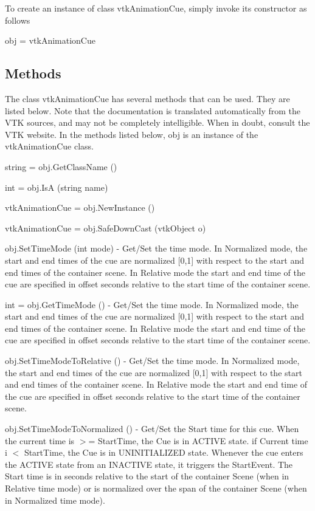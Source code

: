 To create an instance of class vtk\-Animation\-Cue, simply invoke its constructor as follows \begin{DoxyVerb}  obj = vtkAnimationCue
\end{DoxyVerb}
 \hypertarget{vtkwidgets_vtkxyplotwidget_Methods}{}\subsection{Methods}\label{vtkwidgets_vtkxyplotwidget_Methods}
The class vtk\-Animation\-Cue has several methods that can be used. They are listed below. Note that the documentation is translated automatically from the V\-T\-K sources, and may not be completely intelligible. When in doubt, consult the V\-T\-K website. In the methods listed below, {\ttfamily obj} is an instance of the vtk\-Animation\-Cue class. 
\begin{DoxyItemize}
\item {\ttfamily string = obj.\-Get\-Class\-Name ()}  
\item {\ttfamily int = obj.\-Is\-A (string name)}  
\item {\ttfamily vtk\-Animation\-Cue = obj.\-New\-Instance ()}  
\item {\ttfamily vtk\-Animation\-Cue = obj.\-Safe\-Down\-Cast (vtk\-Object o)}  
\item {\ttfamily obj.\-Set\-Time\-Mode (int mode)} -\/ Get/\-Set the time mode. In Normalized mode, the start and end times of the cue are normalized \mbox{[}0,1\mbox{]} with respect to the start and end times of the container scene. In Relative mode the start and end time of the cue are specified in offset seconds relative to the start time of the container scene.  
\item {\ttfamily int = obj.\-Get\-Time\-Mode ()} -\/ Get/\-Set the time mode. In Normalized mode, the start and end times of the cue are normalized \mbox{[}0,1\mbox{]} with respect to the start and end times of the container scene. In Relative mode the start and end time of the cue are specified in offset seconds relative to the start time of the container scene.  
\item {\ttfamily obj.\-Set\-Time\-Mode\-To\-Relative ()} -\/ Get/\-Set the time mode. In Normalized mode, the start and end times of the cue are normalized \mbox{[}0,1\mbox{]} with respect to the start and end times of the container scene. In Relative mode the start and end time of the cue are specified in offset seconds relative to the start time of the container scene.  
\item {\ttfamily obj.\-Set\-Time\-Mode\-To\-Normalized ()} -\/ Get/\-Set the Start time for this cue. When the current time is $>$= Start\-Time, the Cue is in A\-C\-T\-I\-V\-E state. if Current time i $<$ Start\-Time, the Cue is in U\-N\-I\-N\-I\-T\-I\-A\-L\-I\-Z\-E\-D state. Whenever the cue enters the A\-C\-T\-I\-V\-E state from an I\-N\-A\-C\-T\-I\-V\-E state, it triggers the Start\-Event. The Start time is in seconds relative to the start of the container Scene (when in Relative time mode) or is normalized over the span of the container Scene (when in Normalized time mode).  

\end{DoxyItemize}

